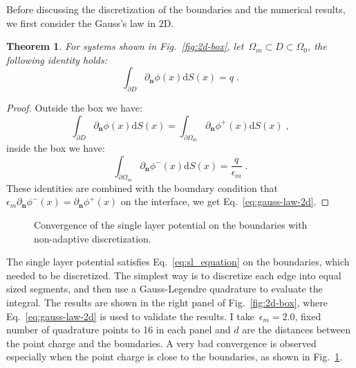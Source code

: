 \documentclass[prb,preprintnumbers,amsmath,amssymb, 10pt]{revtex4}
\newtheorem{theorem}{Theorem}[section]
\begin{document}
Before discussing the discretization of the boundaries and the numerical results, we first consider the Gauss's law in 2D.

\begin{theorem}
    For systems shown in Fig.~\ref{fig:2d-box}, let~$\Omega_m \subset D \subset \Omega_0$, the following identity holds:
    \begin{equation}\label{eq:gauss-law-2d}
        \int_{\partial D} \partial_{\mathbf{n}} \phi(x) \mathrm{d}S(x) = q\;.
    \end{equation}
\end{theorem}

\begin{proof}
    Outside the box we have:
    \begin{equation}
        \int_{\partial D} \partial_{\mathbf{n}} \phi(x) \mathrm{d}S(x) = \int_{\partial \Omega_m} \partial_{\mathbf{n}} \phi^+(x) \mathrm{d}S(x)\;,
    \end{equation}
    inside the box we have:
    \begin{equation}
        \int_{\partial \Omega_m} \partial_{\mathbf{n}} \phi^-(x) \mathrm{d}S(x) = \frac{q}{\epsilon_m}\;.
    \end{equation}
    These identities are combined with the boundary condition that~$\epsilon_m \partial_{\mathbf{n}} \phi^-(x) = \partial_{\mathbf{n}} \phi^+(x)$ on the interface, we get Eq.~\eqref{eq:gauss-law-2d}.
\end{proof}

\begin{figure}[htbp]
    \centering
    
    \caption{Convergence of the single layer potential on the boundaries with non-adaptive discretization.}
    \label{fig:2d-box-convergence-nonadaptive}
\end{figure}

The single layer potential satisfies Eq.~\eqref{eq:sl_equation} on the boundaries, which needed to be discretized.
The simplest way is to discretize each edge into equal sized segments, and then use a Gauss-Legendre quadrature to evaluate the integral.
The results are shown in the right panel of Fig.~\ref{fig:2d-box}, where Eq.~\eqref{eq:gauss-law-2d} is used to validate the results.
I take~$\epsilon_m = 2.0$, fixed number of quadrature points to 16 in each panel and $d$ are the distances between the point charge and the boundaries.
A very bad convergence is observed especially when the point charge is close to the boundaries, as shown in Fig.~\ref{fig:2d-box-convergence-nonadaptive}.
\end{document}
